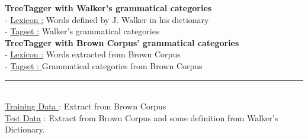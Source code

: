 \begin{center}
\textbf{TreeTagger with Walker's grammatical categories}\\[3mm]

	- \underline{Lexicon :} Words defined by J. Walker in his dictionary\\[2mm]
	- \underline{Tagset :} Walker's grammatical categories\\[2mm]

\textbf{TreeTagger with Brown Corpus' grammatical categories}\\[3mm]

	- \underline{Lexicon :} Words extracted from Brown Corpus\\[2mm]
	- \underline{Tagset : } Grammatical categories from Brown Corpus\\[3mm]

\noindent\rule{4cm}{0.4pt} \\[2mm]

\underline{Training Data }: Extract from Brown Corpus\\[2mm]
\underline{Test Data} : Extract from Brown Corpus and some definition from Walker's Dictionary.
\end{center}
